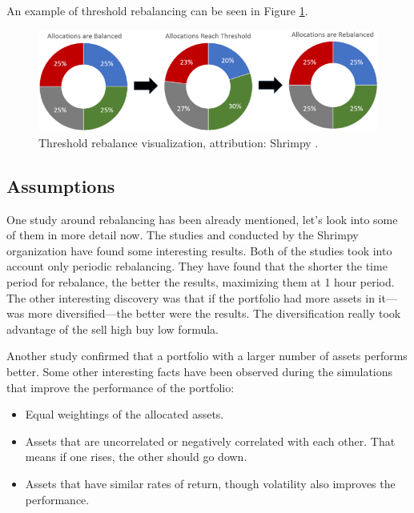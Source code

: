 An example of threshold rebalancing can be seen in Figure \ref{threshold-rebalance-figure}.

\begin{figure}[ht]
    \centering
    \includegraphics[width=\columnwidth]{figures/threshold-rebalance.png}
    \caption{Threshold rebalance visualization, attribution: Shrimpy \cite{portfolio-rebalancing}.}
    \label{threshold-rebalance-figure}
\end{figure}

\subsection*{Assumptions}
\label{rebalance-assumptions}
One study around rebalancing has been already mentioned, let's look into some of them in more detail now. The studies \cite{portfolio-diversity} and \cite{diversify-perform-better} conducted by the Shrimpy organization have found some interesting results. Both of the studies took into account only periodic rebalancing. They have found that the shorter the time period for rebalance, the better the results, maximizing them at 1 hour period. The other interesting discovery was that if the portfolio had more assets in it---was more diversified---the better were the results. The diversification really took advantage of the sell high buy low formula.

Another study \cite{rebalancing-strategy} confirmed that a portfolio with a larger number of assets performs better. Some other interesting facts have been observed during the simulations that improve the performance of the portfolio:
\begin{itemize}
    \item Equal weightings of the allocated assets.
    \item Assets that are uncorrelated or negatively correlated with each other. That means if one rises, the other should go down.
    \item Assets that have similar rates of return, though volatility also improves the performance.
\end{itemize}

